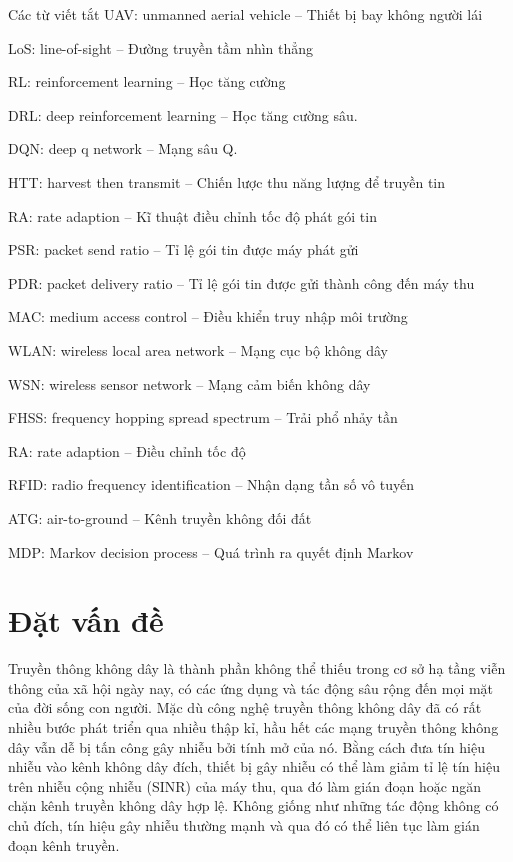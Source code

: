 \documentclass{uetgraduation}
\begin{document}
\begin{contentlisting}

\tableofcontents
\listoffigures

\begin{contentlistingsection}{Các từ viết tắt}
    UAV: unmanned aerial vehicle -- Thiết bị bay không người lái

    LoS: line-of-sight -- Đường truyền tầm nhìn thẳng

    RL: reinforcement learning -- Học tăng cường

    DRL: deep reinforcement learning -- Học tăng cường sâu.
    
    DQN: deep q network -- Mạng sâu Q.

    HTT: harvest then transmit -- Chiến lược thu năng lượng để truyền tin

    RA: rate adaption -- Kĩ thuật điều chỉnh tốc độ phát gói tin

    PSR: packet send ratio -- Tỉ lệ gói tin được máy phát gửi

    PDR: packet delivery ratio -- Tỉ lệ gói tin được gửi thành công đến máy thu

    MAC: medium access control -- Điều khiển truy nhập môi trường

    WLAN: wireless local area network -- Mạng cục bộ không dây

    WSN: wireless sensor network -- Mạng cảm biến không dây

    FHSS: frequency hopping spread spectrum -- Trải phổ nhảy tần

    RA: rate adaption -- Điều chỉnh tốc độ

    RFID: radio frequency identification -- Nhận dạng tần số vô tuyến

    ATG: air-to-ground -- Kênh truyền không đối đất

    MDP: Markov decision process -- Quá trình ra quyết định Markov
\end{contentlistingsection}

\end{contentlisting}

\chapter{Đặt vấn đề}
Truyền thông không dây là thành phần không thể thiếu trong cơ sở hạ tầng viễn thông của xã hội ngày nay, có các ứng dụng và
tác động sâu rộng đến mọi mặt của đời sống con người. Mặc dù công nghệ truyền thông không dây đã có rất nhiều bước phát triển
qua nhiều thập kỉ, hầu hết các mạng truyền thông không dây vẫn dễ bị tấn công gây nhiễu bởi tính mở của nó. Bằng cách đưa tín
hiệu nhiễu vào kênh không dây đích, thiết bị gây nhiễu có thể làm giảm tỉ lệ tín hiệu trên nhiễu cộng nhiễu (SINR) của máy thu,
qua đó làm gián đoạn hoặc ngăn chặn kênh truyền không dây hợp lệ. Không giống như những tác động không có chủ đích, tín hiệu gây
nhiễu thường mạnh và qua đó có thể liên tục làm gián đoạn kênh truyền.
\end{document}
